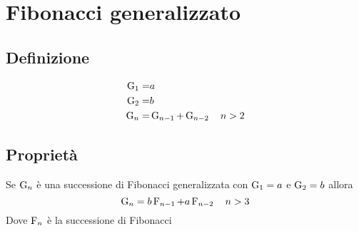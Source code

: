 \chapter{Fibonacci generalizzato}
\section{Definizione}
\begin{defn}
	\begin{align}
		\operatorname{G}_{1}=&a\notag\\
		\operatorname{G}_{2}=&b\notag\\
		\operatorname{G}_{n}=&\operatorname{G}_{n-1}+\operatorname{G}_{n-2}\quad n>2\label{eqn:FiboGendef}
	\end{align}
\end{defn}
\section{Proprietà}
\begin{thm}[Derivazione]
	Se $\operatorname{G}_{n}$ è una successione di Fibonacci generalizzata  con $\operatorname{G}_{1}=a$ e $\operatorname{G}_{2}=b$ allora
\begin{equation}
	\operatorname{G}_{n}=b\operatorname{F}_{n-1}+a\operatorname{F}_{n-2}\quad n>3
\end{equation}\label{thm:FibGenDer}
Dove $\operatorname{F}_{n}$ è la successione di Fibonacci
\end{thm}